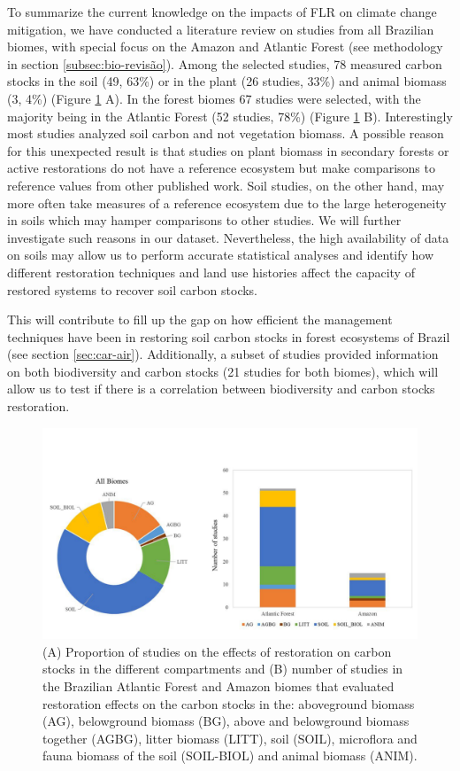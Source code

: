 To summarize the current knowledge on the impacts of FLR on climate change mitigation, we have conducted a literature review on studies from all Brazilian biomes, with special focus on the Amazon and Atlantic Forest (see methodology in section \ref{subsec:bio-revisão}). Among the selected studies, 78 measured carbon stocks in the soil (49, 63\%) or in the plant (26 studies, 33\%) and animal biomass (3, 4\%) (Figure \ref{fig:Carb-Cata-1} A). In the forest biomes 67 studies were selected, with the majority being in the Atlantic Forest (52 studies, 78\%) (Figure \ref{fig:Carb-Cata-1} B). Interestingly most studies analyzed soil carbon and not vegetation biomass. A possible reason for this unexpected result is that studies on plant biomass in secondary forests or active restorations do not have a reference ecosystem but make comparisons to reference values from other published work. Soil studies, on the other hand, may more often take measures of a reference ecosystem due to the large heterogeneity in soils which may hamper comparisons to other studies. We will further investigate such reasons in our dataset. Nevertheless, the high availability of data on soils may allow us to perform accurate statistical analyses and identify how different restoration techniques and land use histories affect the capacity of restored systems to recover soil carbon stocks. 

This will contribute to fill up the gap on how efficient the management techniques have been in restoring soil carbon stocks in forest ecosystems of Brazil (see section \ref{sec:car-air}). Additionally, a subset of studies provided information on both biodiversity and carbon stocks (21 studies for both biomes), which will allow us to test if there is a correlation between biodiversity and carbon stocks restoration. 


\begin{figure}[H]
\includegraphics[width=1.0\linewidth]{pictureve/Carb-Cata-1.pdf}
\caption{(A) Proportion of studies on the effects of restoration on carbon stocks in the different compartments and (B) number of studies in the Brazilian Atlantic Forest and Amazon biomes that evaluated restoration effects on the carbon stocks in the: aboveground biomass (AG), belowground biomass (BG), above and belowground biomass together (AGBG), litter biomass (LITT), soil (SOIL), microflora and fauna biomass of the soil (SOIL-BIOL) and animal biomass (ANIM).}
\label{fig:Carb-Cata-1}
\end{figure}

